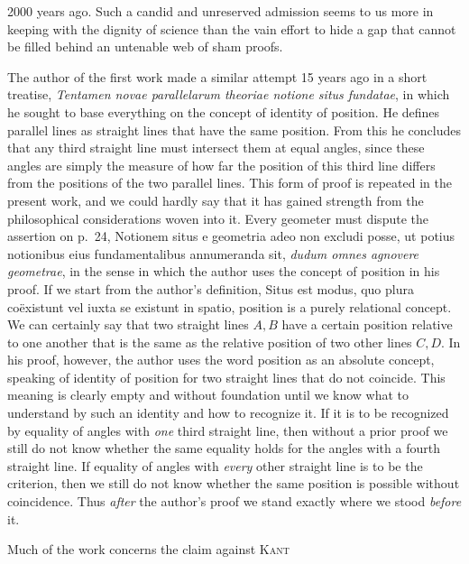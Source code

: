 %
2000 years ago. Such a candid and unreserved admission seems to us more in keeping with the dignity of science than the vain effort to hide a gap that cannot be filled behind an untenable web of sham proofs.

The author of the first work made a similar attempt 15 years ago in a short treatise, \textit{Tentamen novae parallelarum theoriae notione situs fundatae}, in which he sought to base everything on the concept of identity of position. He defines parallel lines as straight lines that have the same position. From this he concludes that any third straight line must intersect them at equal angles, since these angles are simply the measure of how far the position of this third line differs from the positions of the two parallel lines. This form of proof is repeated in the present work, and we could hardly say that it has gained strength from the philosophical considerations woven into it. Every geometer must dispute the assertion on p.~24, Notionem situs e geometria adeo non excludi posse, ut potius notionibus eius fundamentalibus annumeranda sit, \textit{dudum omnes agnovere geometrae}, in the sense in which the author uses the concept of position in his proof. If we start from the author's definition, Situs est modus, quo plura coëxistunt vel iuxta se existunt in spatio, position is a purely relational concept. We can certainly say that two straight lines \(A,B\) have a certain position relative to one another that is the same as the relative position of two other lines \(C,D\). In his proof, however, the author uses the word position as an absolute concept, speaking of identity of position for two straight lines that do not coincide. This meaning is clearly empty and without foundation until we know what to understand by such an identity and how to recognize it. If it is to be recognized by equality of angles with \textit{one} third straight line, then without a prior proof we still do not know whether the same equality holds for the angles with a fourth straight line. If equality of angles with \textit{every} other straight line is to be the criterion, then we still do not know whether the same position is possible without coincidence. Thus \textit{after} the author's proof we stand exactly where we stood \textit{before} it.

Much of the work concerns the claim against \textsc{Kant}
